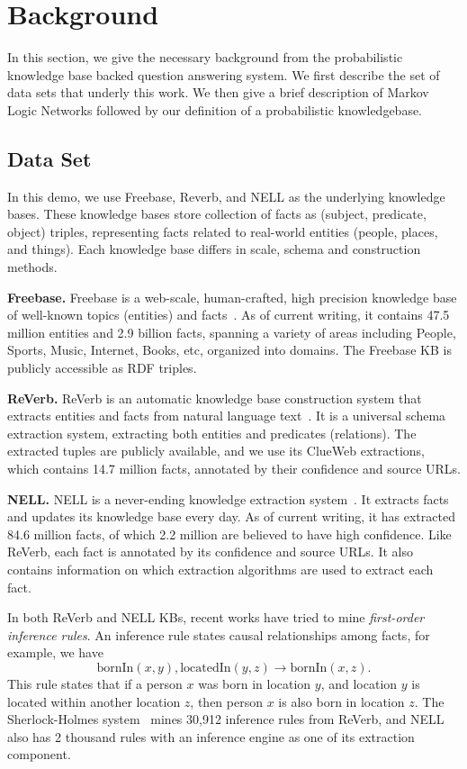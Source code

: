 
\section{Background}

In this section, we give the necessary background from the probabilistic knowledge base backed question answering system.
We first describe the set of data sets that underly this work.
We then give a brief description of Markov Logic Networks followed by our definition of a probabilistic knowledgebase.

\subsection{Data Set}
\label{sec:probqa-dataset}

In this demo, we use Freebase, Reverb, and NELL as the underlying knowledge bases.
These knowledge bases store collection of facts as (subject, predicate, object) triples,
representing facts related to real-world entities (people, places, and things).
Each knowledge base differs in scale, schema and construction methods.

\textbf{Freebase.} Freebase is a web-scale, human-crafted, high precision knowledge base of
well-known topics (entities) and facts~\cite{bollacker2008freebase}.
As of current writing, it contains 47.5 million entities
and 2.9 billion facts, spanning a variety of areas including People, Sports, Music, Internet,
Books, etc, organized into domains. The Freebase KB is publicly accessible as RDF triples.

\textbf{ReVerb.} ReVerb is an automatic knowledge base construction system
that extracts entities and facts from natural language text~\cite{fader2011identifying}.
It is a universal schema extraction system, extracting both entities and predicates (relations).
The extracted tuples are publicly available, and we use
its ClueWeb extractions, which contains 14.7 million facts, annotated by their confidence
and source URLs.

\textbf{NELL.} NELL is a never-ending knowledge extraction system~\cite{mitchell2015never}.
It extracts facts and updates its knowledge base every day.
As of current writing, it has extracted 84.6 million facts, of
which 2.2 million are believed to have high confidence.
Like ReVerb, each fact is annotated by its confidence and source URLs.
It also contains information on which extraction
algorithms are used to extract each fact.

In both ReVerb and NELL KBs, recent works have tried to mine \emph{first-order inference rules}.
An inference rule states causal relationships among facts, for example, we have
\[
\text{bornIn}(x, y), \text{locatedIn}(y, z) \rightarrow \text{bornIn}(x, z).
\]
This rule states that if a person \(x\) was born in location \(y\), and location \(y\)
is located within another location \(z\), then person \(x\) is also born in location \(z\).
The Sherlock-Holmes system~\cite{schoenmackers2010learning} mines 30,912 inference rules from ReVerb, and NELL also
has 2 thousand rules with an inference engine as one of its extraction component.


